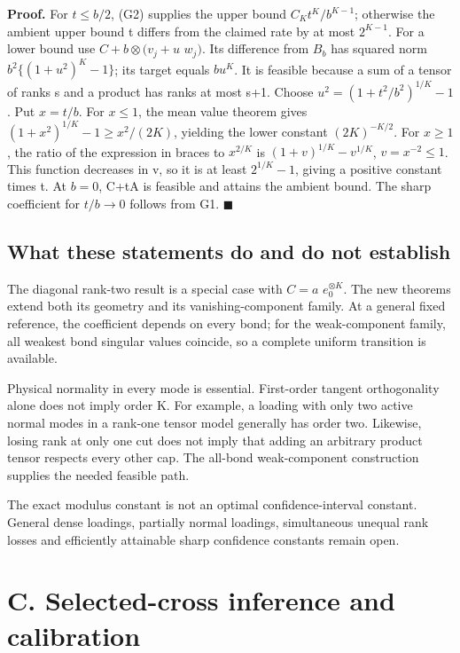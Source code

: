 \documentclass[
  11pt,
]{article}
\begin{document}
\textbf{Proof.} For \(t\le b/2\), (G2) supplies the upper bound
\(C_Kt^K/b^{K-1}\); otherwise the ambient upper bound t differs from the
claimed rate by at most \(2^{K-1}\). For a lower bound use
\(C+b\otimes (v_j+u\) \(w_j)\). Its difference from \(B_b\) has squared
norm \(b^{2}\{(1+u^{2})^K-1\}\); its target equals \(bu^K\). It is
feasible because a sum of a tensor of ranks s and a product has ranks at
most s+1. Choose \(u^{2}=(1+t^{2}/b^{2})^{1/K}-1\). Put \(x=t/b\). For
\(x\le 1\), the mean value theorem gives
\((1+x^{2})^{1/K}-1\ge x^{2}/(2K)\), yielding the lower constant
\((2K)^{-K/2}\). For \(x\ge 1\), the ratio of the expression in braces
to \(x^{2/K}\) is \((1+v)^{1/K}-v^{1/K}\), \(v=x^{-2}\le 1\). This
function decreases in v, so it is at least \(2^{1/K}-1\), giving a
positive constant times t. At \(b=0\), C+tA is feasible and attains the
ambient bound. The sharp coefficient for \(t/b\to 0\) follows from G1.
\(\blacksquare\)

\subsection{What these statements do and do not
establish}\label{what-these-statements-do-and-do-not-establish}

The diagonal rank-two result is a special case with \(C=a\)
\(e_0^{\otimes K}\). The new theorems extend both its geometry and its
vanishing-component family. At a general fixed reference, the
coefficient depends on every bond; for the weak-component family, all
weakest bond singular values coincide, so a complete uniform transition
is available.

Physical normality in every mode is essential. First-order tangent
orthogonality alone does not imply order K. For example, a loading with
only two active normal modes in a rank-one tensor model generally has
order two. Likewise, losing rank at only one cut does not imply that
adding an arbitrary product tensor respects every other cap. The
all-bond weak-component construction supplies the needed feasible path.

The exact modulus constant is not an optimal confidence-interval
constant. General dense loadings, partially normal loadings,
simultaneous unequal rank losses and efficiently attainable sharp
confidence constants remain open.

\newpage

\section{C. Selected-cross inference and
calibration}\label{c.-selected-cross-inference-and-calibration}
\end{document}
